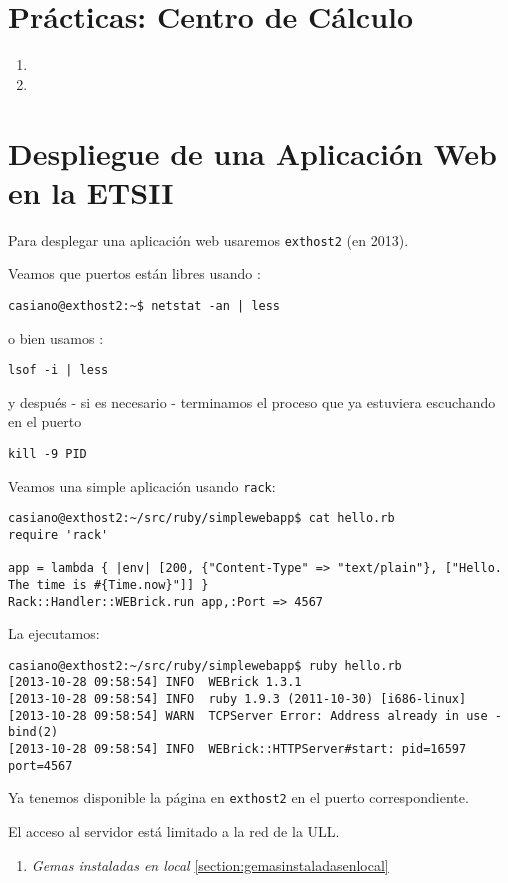 \section{Prácticas: Centro de Cálculo}

\begin{enumerate}
\item 
{}
\item 
{}
\end{enumerate}


\section{Despliegue de una Aplicación Web en la ETSII}
Para desplegar una aplicación web usaremos \verb|exthost2| (en 2013).

Veamos que puertos están libres usando :
\begin{verbatim}
casiano@exthost2:~$ netstat -an | less
\end{verbatim}
o bien usamos : 
\begin{verbatim}
lsof -i | less
\end{verbatim}
y después - si es necesario - terminamos el proceso que ya estuviera escuchando en el puerto
\begin{verbatim}
kill -9 PID
\end{verbatim}

Veamos una simple aplicación usando \verb|rack|:
\begin{verbatim}
casiano@exthost2:~/src/ruby/simplewebapp$ cat hello.rb 
require 'rack'

app = lambda { |env| [200, {"Content-Type" => "text/plain"}, ["Hello. The time is #{Time.now}"]] }
Rack::Handler::WEBrick.run app,:Port => 4567
\end{verbatim}
La ejecutamos:
\begin{verbatim}
casiano@exthost2:~/src/ruby/simplewebapp$ ruby hello.rb 
[2013-10-28 09:58:54] INFO  WEBrick 1.3.1
[2013-10-28 09:58:54] INFO  ruby 1.9.3 (2011-10-30) [i686-linux]
[2013-10-28 09:58:54] WARN  TCPServer Error: Address already in use - bind(2)
[2013-10-28 09:58:54] INFO  WEBrick::HTTPServer#start: pid=16597 port=4567
\end{verbatim}
Ya tenemos disponible la página en \verb|exthost2| en el puerto correspondiente.

El acceso al servidor está limitado a
la red de la ULL.

\begin{enumerate}
\item 
{\it Gemas instaladas en local} \ref{section:gemasinstaladasenlocal}
\end{enumerate}


